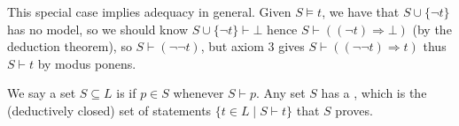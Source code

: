 \documentclass[a4paper, 10pt, twocolumn]{amsart}
\begin{document}
This special case implies adequacy in general. Given $S \models t$, we have that $S \cup \{\lnot t\}$ has no model, so we should know $S \cup \{\lnot t \} \vdash \bot$ hence $S \vdash ((\lnot t) \Rightarrow \bot)$ (by the deduction theorem), so $S \vdash (\lnot \lnot t)$, but axiom 3 gives $S \vdash ((\lnot \lnot t) \Rightarrow t)$ thus $S \vdash t$ by modus ponens.

\begin{definition}
  We say a set $S \subseteq L$ is  if $p \in S$ whenever $S \vdash p$. Any set $S$ has a , which is the (deductively closed) set of statements $\{t \in L \mid S \vdash t\}$ that $S$ proves. 
\end{definition}

\end{document}
